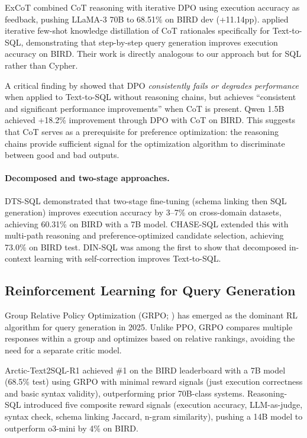 \documentclass[11pt]{article}
\begin{document}
ExCoT \citep{yao2025excot} combined CoT reasoning with iterative DPO using execution accuracy as feedback, pushing LLaMA-3 70B to 68.51\% on BIRD dev (+11.14pp). \citet{rossiello2025rationalization} applied iterative few-shot knowledge distillation of CoT rationales specifically for Text-to-SQL, demonstrating that step-by-step query generation improves execution accuracy on BIRD. Their work is directly analogous to our approach but for SQL rather than Cypher.

A critical finding by \citet{liu2025dpo} showed that DPO \emph{consistently fails or degrades performance} when applied to Text-to-SQL without reasoning chains, but achieves ``consistent and significant performance improvements'' when CoT is present. Qwen 1.5B achieved +18.2\% improvement through DPO with CoT on BIRD. This suggests that CoT serves as a prerequisite for preference optimization: the reasoning chains provide sufficient signal for the optimization algorithm to discriminate between good and bad outputs.

\paragraph{Decomposed and two-stage approaches.} DTS-SQL \citep{pourreza2024dtssql} demonstrated that two-stage fine-tuning (schema linking then SQL generation) improves execution accuracy by 3--7\% on cross-domain datasets, achieving 60.31\% on BIRD with a 7B model. CHASE-SQL \citep{pourreza2025chasesql} extended this with multi-path reasoning and preference-optimized candidate selection, achieving 73.0\% on BIRD test. DIN-SQL \citep{pourreza2023dinsql} was among the first to show that decomposed in-context learning with self-correction improves Text-to-SQL.

\subsection{Reinforcement Learning for Query Generation}

Group Relative Policy Optimization (GRPO; \citealt{shao2024deepseekmath}) has emerged as the dominant RL algorithm for query generation in 2025. Unlike PPO, GRPO compares multiple responses within a group and optimizes based on relative rankings, avoiding the need for a separate critic model.

Arctic-Text2SQL-R1 \citep{yao2025arctic} achieved \#1 on the BIRD leaderboard with a 7B model (68.5\% test) using GRPO with minimal reward signals (just execution correctness and basic syntax validity), outperforming prior 70B-class systems. Reasoning-SQL \citep{pourreza2025reasoning} introduced five composite reward signals (execution accuracy, LLM-as-judge, syntax check, schema linking Jaccard, n-gram similarity), pushing a 14B model to outperform o3-mini by 4\% on BIRD.
\end{document}
